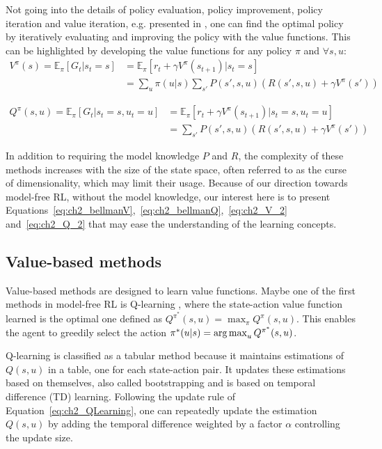Not going into the details of policy evaluation, policy improvement, policy iteration and value iteration, e.g. presented in \citep{sutton2018reinforcement}, one can find the optimal policy by iteratively evaluating and improving the policy with the value functions.
This can be highlighted by developing the value functions for any policy $\pi$ and $\forall s, u$:
\begin{equation}
\label{eq:ch2_V_2}
\begin{split}
    V^\pi(s)= \mathbb{E}_{\pi}\left[G_t|s_t=s\right] & = \mathbb{E}_{\pi}\left[r_t + \gamma V^\pi(s_{t+1})|s_t=s\right]\\
     & = \sum_{u} \pi(u|s) \sum_{s'} P(s', s, u) (R(s', s, u) + \gamma V^\pi(s'))
\end{split}
\end{equation}

\begin{equation}
\label{eq:ch2_Q_2}
\begin{split}
    Q^\pi(s, u) = \mathbb{E}_{\pi}\left[G_t|s_t=s, u_t=u\right] & = \mathbb{E}_{\pi}\left[r_t + \gamma V^\pi(s_{t+1})|s_t=s, u_t=u \right] \\
    &  = \sum_{s'} P(s', s, u) (R(s', s, u) + \gamma V^\pi(s'))
\end{split}
\end{equation}

In addition to requiring the model knowledge $P$ and $R$, the complexity of these methods increases with the size of the state space, often referred to as the curse of dimensionality, which may limit their usage.
Because of our direction towards model-free RL, without the model knowledge, our interest here is to present Equations~\ref{eq:ch2_bellmanV},~\ref{eq:ch2_bellmanQ},~\ref{eq:ch2_V_2} and~\ref{eq:ch2_Q_2} that may ease the understanding of the learning concepts.


\subsection{Value-based methods} \label{sec:ch2_value_based_methods}
Value-based methods are designed to learn value functions.
Maybe one of the first methods in model-free RL is Q-learning \citep{watkins1992q}, where the state-action value function learned is the optimal one defined as $Q^{\pi^*}(s, u)=\max_{\pi}Q^\pi(s, u)$.
This enables the agent to greedily select the action $\pi^*(u|s)=\operatorname*{arg\,max}_u Q^{\pi^*}(s, u)$.

Q-learning is classified as a tabular method because it maintains estimations of $Q(s, u)$ in a table, one for each state-action pair.
It updates these estimations based on themselves, also called bootstrapping and is based on temporal difference (TD) learning.
Following the update rule of Equation~\ref{eq:ch2_QLearning}, one can repeatedly update the estimation $Q(s, u)$ by adding the temporal difference weighted by a factor $\alpha$ controlling the update size.


